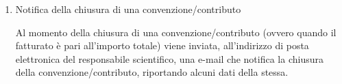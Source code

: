 \begin{enumerate}
\begin{enumerate}
  
 \item Notifica della chiusura di una convenzione/contributo\\ \label{UC_notify_closed_contract}
 
    Al momento della chiusura di una convenzione/contributo (ovvero quando il fatturato è pari all'importo totale) viene inviata, all'indirizzo di posta elettronica del responsabile scientifico, una e-mail che notifica la chiusura della convenzione/contributo, riportando alcuni dati della stessa.
\end{enumerate}


\end{enumerate}

